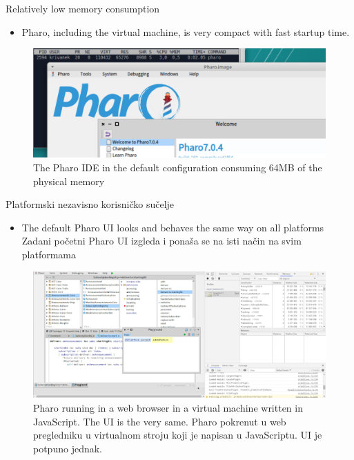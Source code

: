 \documentclass{beamer}
\begin{document}
\begin{frame}{Relatively low memory consumption}
\begin{itemize}
    \item Pharo, including the virtual machine, is very compact with fast startup time.
\end{itemize}
\begin{figure}
    \centering
    \includegraphics[width=0.5\linewidth]{memory.png}
    \caption{The Pharo IDE in the default configuration consuming 64MB of the physical memory}
    \label{fig:memory}
\end{figure}
\end{frame}

\begin{frame}{Platformski nezavisno korisničko sučelje}
\begin{itemize}
    \item The default Pharo UI looks and behaves the same way on all platforms
    Zadani početni Pharo UI izgleda i ponaša se na isti način na svim platformama
\end{itemize}
\begin{figure}
    \centering
    \includegraphics[width=0.5\linewidth]{web.png}
    \caption{Pharo running in a web browser in a virtual machine written in JavaScript. The UI is the very same. Pharo pokrenut u web pregledniku u virtualnom stroju koji je napisan u JavaScriptu. UI je potpuno jednak.}
    \label{fig:web}
\end{figure}
\end{frame}
\end{document}

